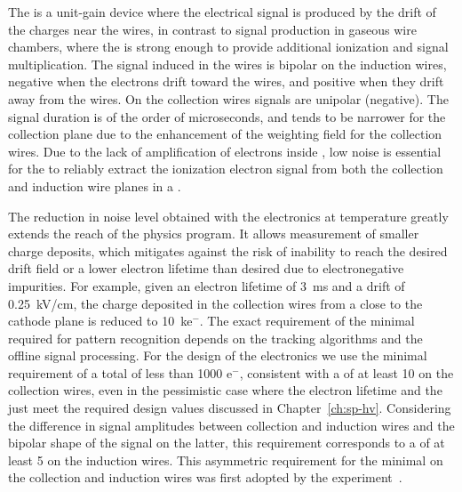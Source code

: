 The    is a unit-gain device where the 
electrical signal is produced by the drift of the charges near the wires, 
in contrast to signal production in gaseous wire 
chambers, where the \efield is strong enough to provide additional
ionization and signal multiplication. The signal induced in the 
 wires is bipolar on the induction wires, negative when the
electrons drift toward the wires, and positive when they drift away from
the wires. On the collection wires signals are unipolar (negative).
The signal duration is of the order of microseconds, and tends to be narrower
for the collection plane due to the enhancement of the weighting field for
the collection wires. Due to the lack of amplification of electrons inside 
, low noise is essential for the  to reliably extract the 
ionization electron signal from both the collection and induction wire planes 
in a  . 

The reduction in noise level obtained with the  electronics at 
 temperature greatly extends the reach of the  
physics program. It allows measurement of smaller charge deposits, which 
mitigates against the risk of inability to reach the desired drift field 
or a lower electron lifetime than desired due to electronegative impurities.
For example, given an electron lifetime of \SI{3}{ms} and a drift \efield
of \SI{0.25}{kV/cm}, the charge deposited in the collection wires from a 
 close to the cathode plane is reduced to \SI{10}{k}{e$^-$}.
The exact requirement of the minimal  required for pattern
recognition depends on the tracking algorithms and the offline signal 
processing. For the design of the  electronics we use the
minimal requirement of a total  of less than 1000 e$^-$, consistent 
with a  of at least 10 on the collection wires, even in the
pessimistic case where the electron lifetime and the \efield just meet 
the required design values discussed in Chapter~\ref{ch:sp-hv}. Considering
the difference in signal amplitudes between collection and induction wires
and the bipolar shape of the signal on the latter, this requirement corresponds 
to a  of at least 5 on the induction wires. This asymmetric requirement 
for the minimal  on the collection and induction wires was first 
adopted by the  experiment~\cite{bib:sbnddoc1921}.

